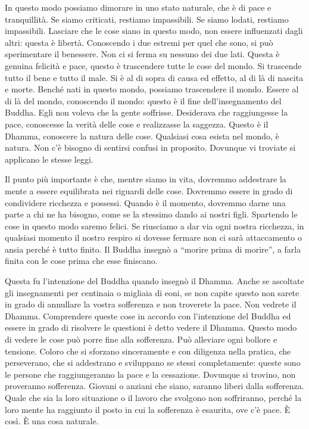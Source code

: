 In questo modo possiamo dimorare in uno stato naturale, che è di pace e
tranquillità. Se siamo criticati, restiamo impassibili. Se siamo lodati,
restiamo impassibili. Lasciare che le cose siano in questo modo, non
essere influenzati dagli altri: questa è libertà. Conoscendo i due
estremi per quel che sono, si può sperimentare il benessere. Non ci si
ferma su nessuno dei due lati. Questa è genuina felicità e pace, questo
è trascendere tutte le cose del mondo. Si trascende tutto il bene e
tutto il male. Si è al di sopra di causa ed effetto, al di là di nascita
e morte. Benché nati in questo mondo, possiamo trascendere il mondo.
Essere al di là del mondo, conoscendo il mondo: questo è il fine
dell'insegnamento del Buddha. Egli non voleva che la gente soffrisse.
Desiderava che raggiungesse la pace, conoscesse la verità delle cose e
realizzasse la saggezza. Questo è il Dhamma, conoscere la natura delle
cose. Qualsiasi cosa esista nel mondo, è natura. Non c'è bisogno di
sentirsi confusi in proposito. Dovunque vi troviate si applicano le
stesse leggi.

Il punto più importante è che, mentre siamo in vita, dovremmo addestrare
la mente a essere equilibrata nei riguardi delle cose. Dovremmo essere
in grado di condividere ricchezza e possessi. Quando è il momento,
dovremmo darne una parte a chi ne ha bisogno, come se la stessimo dando
ai nostri figli. Spartendo le cose in questo modo saremo felici. Se
riusciamo a dar via ogni nostra ricchezza, in qualsiasi momento il
nostro respiro si dovesse fermare non ci sarà attaccamento o ansia
perché è tutto finito. Il Buddha insegnò a ``morire prima di morire'', a
farla finita con le cose prima che esse finiscano.

Questa fu l'intenzione del Buddha quando insegnò il Dhamma. Anche se
ascoltate gli insegnamenti per centinaia o migliaia di eoni, se non
capite questo non sarete in grado di annullare la vostra sofferenza e
non troverete la pace. Non vedrete il Dhamma. Comprendere queste cose in
accordo con l'intenzione del Buddha ed essere in grado di risolvere le
questioni è detto vedere il Dhamma. Questo modo di vedere le cose può
porre fine alla sofferenza. Può alleviare ogni bollore e tensione.
Coloro che si sforzano sinceramente e con diligenza nella pratica, che
perseverano, che si addestrano e sviluppano se stessi completamente:
queste sono le persone che raggiungeranno la pace e la cessazione.
Dovunque si trovino, non proveranno sofferenza. Giovani o anziani che
siano, saranno liberi dalla sofferenza. Quale che sia la loro situazione
o il lavoro che svolgono non soffriranno, perché la loro mente ha
raggiunto il posto in cui la sofferenza è esaurita, ove c'è pace. È
così. È una cosa naturale.

